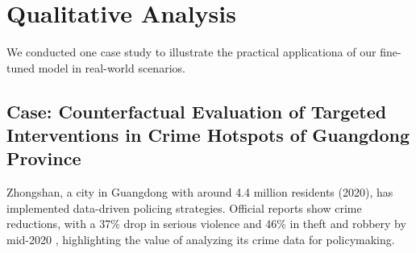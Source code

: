 

\section{Qualitative Analysis}

We conducted one case study to illustrate the practical applicationa of our fine-tuned model in real-world scenarios. 


\subsection{Case: Counterfactual Evaluation of Targeted Interventions in Crime Hotspots of Guangdong Province}

Zhongshan, a city in Guangdong with around 4.4 million residents (2020), has implemented data-driven policing strategies. Official reports show crime reductions, with a 37\% drop in serious violence and 46\% in theft and robbery by mid-2020 \cite{Zhongshan2020}, highlighting the value of analyzing its crime data for policymaking.

